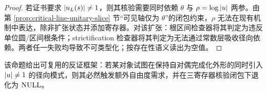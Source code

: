 \begin{proof}
若证书要求 $\left\lvert u_L(s)\right\rvert\neq 1$，则其核验需要同时依赖 $\theta$ 与 $\rho=\log\left\lvert u\right\rvert$ 两参。由第 \ref{prop:critical-line-unitary-slice} 节“可见轴仅为 $\theta$”的闭包约束，$\rho$ 无法在现有机制中表达，除非扩张状态并添加寄存器。对该扩张：根区间检查器将其判定为违反单位圆/区间根条件；strictification 检查器将其判定为无法通过常数层吸收径向依赖。两者任一失败均导致不可类型化；按存在性语义读出为空值。
\end{proof}

该命题给出可复用的反证框架：若某对象试图在保持自对偶完成化外形的同时引入 $\left\lvert u\right\rvert\neq 1$ 的径向模式，则其必然触发额外自由度需求，并在三寄存器核验闭包下退化为 $\mathrm{NULL}$。

